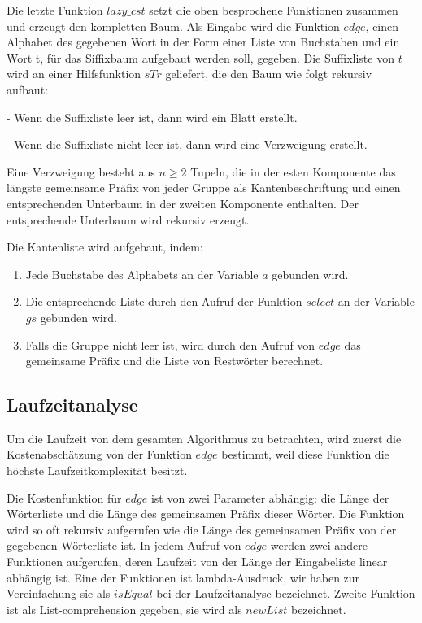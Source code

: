 \documentclass[12pt]{report}
\begin{document}
Die letzte Funktion $lazy\_cst$ setzt die oben besprochene Funktionen zusammen und erzeugt den kompletten Baum. Als Eingabe wird die Funktion $edge$, einen Alphabet des gegebenen Wort in der Form einer Liste von Buchstaben und ein Wort t, für das Siffixbaum aufgebaut werden soll, gegeben. Die Suffixliste von $t$ wird an einer Hilfsfunktion $sTr$ geliefert, die den Baum wie folgt rekursiv aufbaut:

    - Wenn die Suffixliste leer ist, dann wird ein Blatt erstellt.

    - Wenn die Suffixliste nicht leer ist, dann wird eine Verzweigung erstellt.

Eine Verzweigung besteht aus $n \ge 2$ Tupeln, die in der esten Komponente das längste gemeinsame Präfix von jeder Gruppe als Kantenbeschriftung und einen entsprechenden Unterbaum in der zweiten Komponente enthalten. Der entsprechende Unterbaum wird rekursiv erzeugt.

Die Kantenliste wird aufgebaut, indem:
\begin{enumerate}
    \item Jede Buchstabe des Alphabets an der Variable $a$ gebunden wird.
    \item Die entsprechende Liste durch den Aufruf der Funktion $select$ an der Variable $gs$ gebunden wird.
    \item Falls die Gruppe nicht leer ist, wird durch den Aufruf von $edge$ das gemeinsame Präfix und die Liste von Restwörter berechnet.
\end{enumerate}

\subsection{Laufzeitanalyse}
\label{sec:Laufzeitanalyse}

Um die Laufzeit von dem gesamten Algorithmus zu betrachten, wird zuerst die Kostenabschätzung von der Funktion $edge$ bestimmt, weil diese Funktion die höchste Laufzeitkomplexität besitzt.

Die Kostenfunktion für $edge$ ist von zwei Parameter abhängig: die Länge der Wörterliste und die Länge des gemeinsamen Präfix dieser Wörter. Die Funktion wird so oft rekursiv aufgerufen wie die Länge des gemeinsamen Präfix von der gegebenen Wörterliste ist. In jedem Aufruf von $edge$ werden zwei andere Funktionen aufgerufen, deren Laufzeit von der Länge der Eingabeliste linear abhängig ist. Eine der Funktionen ist lambda-Ausdruck, wir haben zur Vereinfachung sie als $isEqual$ bei der Laufzeitanalyse bezeichnet. Zweite Funktion ist als List-comprehension gegeben, sie wird als $newList$ bezeichnet.
\end{document}
